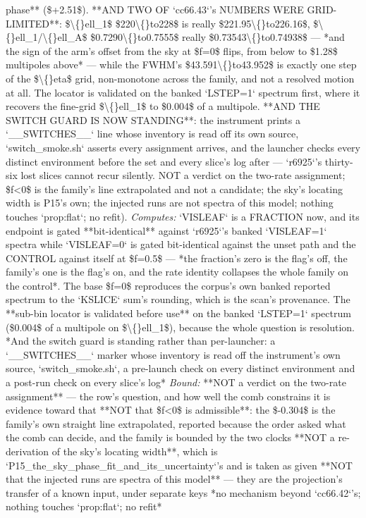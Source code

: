 \begin{description}
phase** (\$+2.51\$).  **AND TWO OF `cc66.43`'s NUMBERS WERE GRID-LIMITED**: \$\textbackslash\{\}ell\_1\$ \$220\textbackslash\{\}to228\$ is really \$221.95\textbackslash\{\}to226.16\$, \$\textbackslash\{\}ell\_1/\textbackslash\{\}ell\_A\$ \$0.7290\textbackslash\{\}to0.7555\$ really \$0.73543\textbackslash\{\}to0.74938\$ --- *and the sign of the arm's offset from the sky at \$f=0\$ flips, from below to \$1.28\$ multipoles above* --- while the FWHM's \$43.591\textbackslash\{\}to43.952\$ is exactly one step of the \$\textbackslash\{\}eta\$ grid, non-monotone across the family, and not a resolved motion at all. The locator is validated on the banked `LSTEP=1` spectrum first, where it recovers the fine-grid \$\textbackslash\{\}ell\_1\$ to \$0.004\$ of a multipole.  **AND THE SWITCH GUARD IS NOW STANDING**: the instrument prints a `\_\_SWITCHES\_\_` line whose inventory is read off its own source, `switch\_smoke.sh` asserts every assignment arrives, and the launcher checks every distinct environment before the set and every slice's log after --- `r6925`'s thirty-six lost slices cannot recur silently.  NOT a verdict on the two-rate assignment; \$f<0\$ is the family's line extrapolated and not a candidate; the sky's locating width is P15's own; the injected runs are not spectra of this model; nothing touches `prop:flat`; no refit). 
\emph{Computes:} `VISLEAF` is a FRACTION now, and its endpoint is gated **bit-identical** against `r6925`'s banked `VISLEAF=1` spectra while `VISLEAF=0` is gated bit-identical against the unset path and the CONTROL against itself at \$f=0.5\$ --- *the fraction's zero is the flag's off, the family's one is the flag's on, and the rate identity collapses the whole family on the control*. The base \$f=0\$ reproduces the corpus's own banked reported spectrum to the `KSLICE` sum's rounding, which is the scan's provenance. The **sub-bin locator is validated before use** on the banked `LSTEP=1` spectrum (\$0.004\$ of a multipole on \$\textbackslash\{\}ell\_1\$), because the whole question is resolution.  *And the switch guard is standing rather than per-launcher: a `\_\_SWITCHES\_\_` marker whose inventory is read off the instrument's own source, `switch\_smoke.sh`, a pre-launch check on every distinct environment and a post-run check on every slice's log*
 \emph{Bound:}  **NOT a verdict on the two-rate assignment** --- the row's question, and how well the comb constrains it is evidence toward that  **NOT that \$f<0\$ is admissible**: the \$-0.304\$ is the family's own straight line extrapolated, reported because the order asked what the comb can decide, and the family is bounded by the two clocks  **NOT a re-derivation of the sky's locating width**, which is `P15\_the\_sky\_phase\_fit\_and\_its\_uncertainty`'s and is taken as given  **NOT that the injected runs are spectra of this model** --- they are the projection's transfer of a known input, under separate keys  *no mechanism beyond `cc66.42`'s; nothing touches `prop:flat`; no refit*

\end{description}
